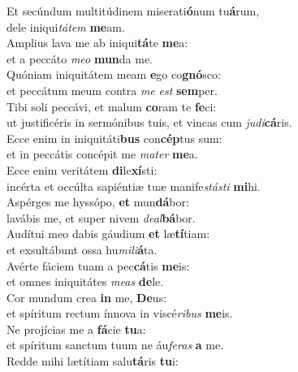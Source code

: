 \evenverse Et secúndum multitúdinem miserati\textbf{ó}num tu\textbf{á}rum,~\*\\
\evenverse dele iniqui\textit{tá}\textit{tem} \textbf{me}am.\\
\oddverse Amplius lava me ab iniqui\textbf{tá}te \textbf{me}a:~\*\\
\oddverse et a peccáto \textit{me}\textit{o} \textbf{mun}da me.\\
\evenverse Quóniam iniquitátem meam \textbf{e}go co\textbf{gnó}sco:~\*\\
\evenverse et peccátum meum contra \textit{me} \textit{est} \textbf{sem}per.\\
\oddverse Tibi soli peccávi, et malum \textbf{co}ram te \textbf{fe}ci:~\*\\
\oddverse ut justificéris in sermónibus tuis, et vincas cum \textit{ju}\textit{di}\textbf{cá}ris.\\
\evenverse Ecce enim in iniquitáti\textbf{bus} con\textbf{cép}tus sum:~\*\\
\evenverse et in peccátis concépit me \textit{ma}\textit{ter} \textbf{me}a.\\
\oddverse Ecce enim veritátem \textbf{di}le\textbf{xí}sti:~\*\\
\oddverse incérta et occúlta sapiéntiæ tuæ manife\textit{stá}\textit{sti} \textbf{mi}hi.\\
\evenverse Aspérges me hyssópo, \textbf{et} mun\textbf{dá}bor:~\*\\
\evenverse lavábis me, et super nivem \textit{de}\textit{al}\textbf{bá}bor.\\
\oddverse Audítui meo dabis gáudium \textbf{et} læ\textbf{tí}tiam:~\*\\
\oddverse et exsultábunt ossa hu\textit{mi}\textit{li}\textbf{á}ta.\\
\evenverse Avérte fáciem tuam a pec\textbf{cá}tis \textbf{me}is:~\*\\
\evenverse et omnes iniquitátes \textit{me}\textit{as} \textbf{de}le.\\
\oddverse Cor mundum crea \textbf{in} me, \textbf{De}us:~\*\\
\oddverse et spíritum rectum ínnova in viscé\textit{ri}\textit{bus} \textbf{me}is.\\
\evenverse Ne projícias me a \textbf{fá}cie \textbf{tu}a:~\*\\
\evenverse et spíritum sanctum tuum ne áu\textit{fe}\textit{ras} \textbf{a} me.\\
\oddverse Redde mihi lætítiam salu\textbf{tá}ris \textbf{tu}i:~\*\\
